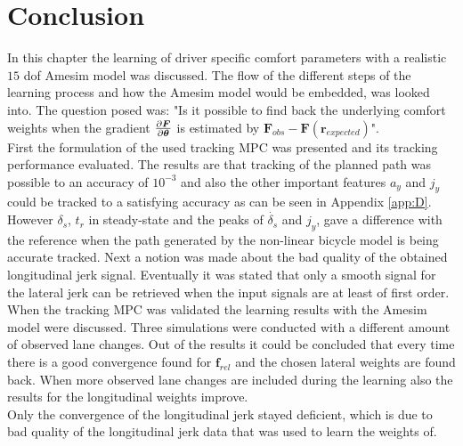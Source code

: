 \section{Conclusion}
In this chapter the learning of driver specific comfort parameters with a realistic $15$ dof Amesim model was discussed. The flow of the different steps of the learning process and how the Amesim model would be embedded, was looked into. The question posed was: "Is it possible to find back the underlying comfort weights when the gradient $\pdv{\bm{F}}{\bm{\theta}}$ is estimated by $ \bm{F}_{obs} - \bm{F}(\bm{r}_{expected})$". \\

First the formulation of the used tracking MPC was presented and its tracking performance evaluated. The results are that tracking of the planned path was possible to an accuracy of $10^{-3}$ and also the other important features $a_y$ and $j_y$ could be tracked to a satisfying accuracy as can be seen in Appendix \ref{app:D}. However $\delta_s$, $t_r$ in steady-state and the peaks of $\dot{\delta_s}$ and $j_y$, gave a difference with the reference when the path generated by the non-linear bicycle model is being accurate tracked. Next a notion was made about the bad quality of the obtained longitudinal jerk signal. Eventually it was stated that only a smooth signal for the lateral jerk can be retrieved when the input signals are at least of first order. \\

When the tracking MPC was validated the learning results with the Amesim model were discussed. Three simulations were conducted with a different amount of observed lane changes. Out of the results it could be concluded that every time there is a good convergence found for $\bm{f}_{rel}$ and the chosen lateral weights are found back. When more observed lane changes are included during the learning also the results for the longitudinal weights improve. \\
Only the convergence of the longitudinal jerk stayed deficient, which is due to bad quality of the longitudinal jerk data that was used to learn the weights of.










